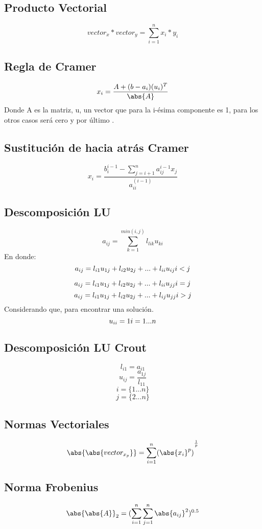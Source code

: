     	\subsection{Producto Vectorial}   
        $$
        	vector_x * vector_y  = \sum_{i=1}^n x_i * y_i
        $$
        
	\subsection{Regla de Cramer}
    $$
    	x_i = \frac{A + (b-a_i)(u_i)^T}{\abs{A} }
    $$
    Donde A es la matriz, u, un vector que para la i-ésima componente es 1, para los otros casos será cero y por último .
    \subsection{Sustitución de hacia atrás Cramer }
    	$$x_i = \frac{b_i^{i-1} - \sum_{j=i+1}^{n} a_{ij}^{i-1} x_j }{a_{ii}^(i-1)}
        $$
   \subsection{Descomposición LU}
   $$ 
   	a_{ij} = \sum_{k=1}^{min (i,j)} l_{lik} u_{ki} 
   $$  
   En donde: 
   $$
    a_{ij} = l_{i1}u_{1j} + l_{i2}u_{2j}+ ... + l_{ii}u_{ij} \space i<j
   $$
   
   $$
    a_{ij} = l_{i1}u_{1j} + l_{i2}u_{2j}+ ... + l_{ii}u_{jj} \space i=j
   $$
   $$
    a_{ij} = l_{i1}u_{1j} + l_{i2}u_{2j}+ ... + l_{ij}u_{jj} \space i>j
   $$
   Considerando que, para encontrar una solución.
   $$
   	u_{ii} = 1 \space i = 1...n
   $$
   \subsection{Descomposición LU Crout }
   $$l_{i1} = a_{i1}$$
   \space
   $$u_{ij} = \frac{a_{1j}}{l_{11}} $$
   $$ i= \{ 1 ... n \} $$ 
   $$   j =\{ 2 ...n\}$$
   
   \subsection{Normas Vectoriales}
   
   $$\abs{ \abs{ vector_{x_p} }}=
   { \sum_{i=1}^{n} (\abs{ x_i }^p)}
   ^{\frac{1}{p}}$$
   
   \subsection{Norma Frobenius }
   $$
   	\abs{ \abs { A } }_2 = ( \sum_{i=1}^{n} \sum_{j=1}^{n} \abs{a_{ij}}^2)^{0.5}
   $$
   
